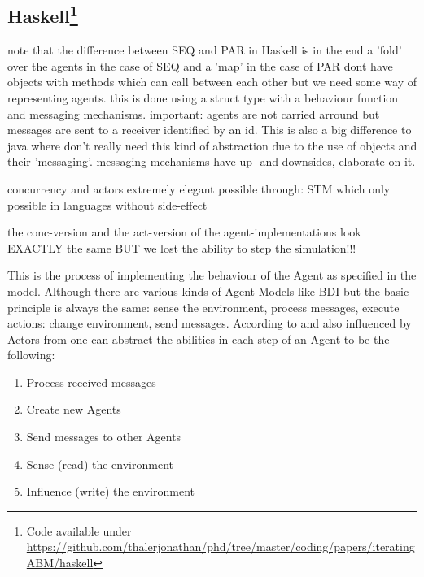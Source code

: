 \subsection[Haskell]{Haskell\footnote{Code available under\\ \url{https://github.com/thalerjonathan/phd/tree/master/coding/papers/iteratingABM/haskell}}}
note that the difference between SEQ and PAR in Haskell is in the end a 'fold' over the agents in the case of SEQ and a 'map' in the case of PAR
dont have objects with methods which can call between each other but we need some way of representing agents. this is done using a struct type with a behaviour function and messaging mechanisms. important: agents are not carried arround but messages are sent to a receiver identified by an id. This is also a big difference to java where don't really need this kind of abstraction due to the use of objects and their 'messaging'. messaging mechanisms have up- and downsides, elaborate on it.

concurrency and actors extremely elegant possible through: STM which only possible in languages without side-effect	

the conc-version and the act-version of the agent-implementations look EXACTLY the same	 BUT we lost the ability to step the simulation!!!

This is the process of implementing the behaviour of the Agent as specified in the model. Although there are various kinds of Agent-Models like BDI but the basic principle is always the same: sense the environment, process messages, execute actions: change environment, send messages. According to \cite{wooldridge_introduction_2009} and also influenced by Actors from \cite{agha_actors:_1986} one can abstract the abilities in each step of an Agent to be the following:

\begin{enumerate}
\item Process received messages
\item Create new Agents
\item Send messages to other Agents
\item Sense (read) the environment
\item Influence (write) the environment
\end{enumerate}
